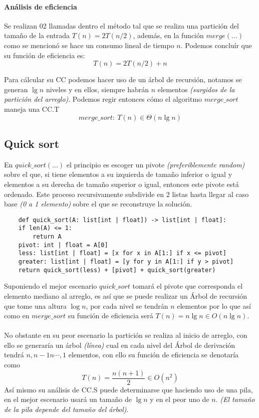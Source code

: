 \paragraph{Análisis de eficiencia}
Se realizan 02 llamadas dentro el método tal que se realiza una partición del tamaño de la entrada $T(n)=2T(n/2)$, además, en la función $merge(...)$ como se mencionó se hace un consumo lineal de tiempo $n$. Podemos concluír que su función de eficiencia es:
$$ T(n) = 2T(n/2)+n $$

Para cálcular su CC podemos hacer uso de un árbol de recursión, notamos se generan $\lg n$ niveles y en ellos, siempre habrán $n$ elementos \textit{(surgidos de la partición del arreglo)}. Podemos regir entonces cómo el algoritmo $merge\_sort$ maneja una CC.T
$$ merge\_sort:~T(n)\in \Theta(n\lg n) $$

\subsection{Quick sort}
En $quick\_sort(...)$ el principio es escoger un pivote \textit{(preferiblemente random)} sobre el que, si tiene elementos a su izquierda de tamaño inferior o igual y elementos a su derecha de tamaño superior o igual, entonces este pivote está ordenado. Este proceso recursivamente subdivide en 2 listas hasta llegar al caso base \textit{(0 a 1 elemento)} sobre el que se reconstruye la solución.
\begin{lstlisting}
    def quick_sort(A: list[int | float]) -> list[int | float]:
    if len(A) <= 1:
        return A
    pivot: int | float = A[0]
    less: list[int | float] = [x for x in A[1:] if x <= pivot]
    greater: list[int | float] = [y for y in A[1:] if y > pivot]
    return quick_sort(less) + [pivot] + quick_sort(greater)
\end{lstlisting}
Suponiendo el mejor escenario $quick\_sort$ tomará el pivote que corresponda el elemento mediano al arreglo, es así que se puede realizar un Árbol de recursión que tome una altura $\log n$, por cada nivel se tendrán $n$ elementos por lo que así como en $merge\_sort$ su función de eficiencia será $T(n)=n\lg n\in O(n\lg n)$.
\\\\
No obstante en su peor escenario la partición se realiza al inicio de arreglo, con ello se generaría un árbol \textit{(línea)} cual en cada nivel del Árbol de derivación tendrá $n,n-1n\cdots,1$ elementos, con ello su función de eficiencia se denotaría como
$$T(n)=\frac{n(n+1)}2\in O(n^2)$$
Así mismo su análisis de CC.S puede determinarse que haciendo uso de una pila, en el mejor escenario usará un tamaño de $\lg n$ y en el peor uno de $n$. \textit{(El tamaño de la pila depende del tamaño del árbol)}.

